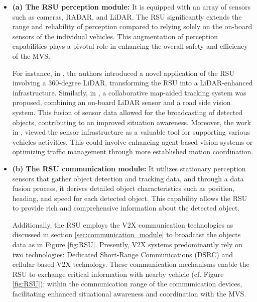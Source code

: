 \begin{itemize}
    \item \textbf{(a) The RSU perception module:} It is equipped with an array of sensors such as cameras, RADAR, and LiDAR. The RSU significantly extends the range and reliability of perception compared to relying solely on the on-board sensors of the individual vehicles. This augmentation of perception capabilities plays a pivotal role in enhancing the overall safety and efficiency of the MVS. 

    For instance, in \cite{chen2019architecture}, the authors introduced a novel application of the RSU involving a 360-degree LiDAR, transforming the RSU into a LiDAR-enhanced infrastructure. Similarly, in \cite{masi2021augmented}, a collaborative map-aided tracking system was proposed, combining an on-board LiDAR sensor and a road side vision system. This fusion of sensor data allowed for the broadcasting of detected objects, contributing to an improved situation awareness. Moreover, the work in \cite{geissler2018designing}, viewed the sensor infrastructure as a valuable tool for supporting various vehicles activities. This could involve enhancing agent-based vision systems or optimizing traffic management through more established motion coordination. 





  \item \textbf{(b) The RSU communication module:} It utilizes stationary perception sensors that gather object detection and tracking data, and through a data fusion process, it derives detailed object characteristics such as position, heading, and speed for each detected object. This capability allows the RSU to provide rich and comprehensive information about the detected object. 

  Additionally, the RSU employs the V2X communication technologies as discussed in section \ref{sec:communication_module} to broadcast the objects data as in Figure \ref{fig:RSU}. Presently, V2X systems predominantly rely on two technologies: Dedicated Short-Range Communications (DSRC) and cellular-based V2X technology. These communication mechanisms enable the RSU to exchange critical information with nearby vehicle (cf. Figure \ref{fig:RSU}); within the communication range of the communication devices, facilitating enhanced situational awareness and coordination with the MVS. 
\end{itemize}



